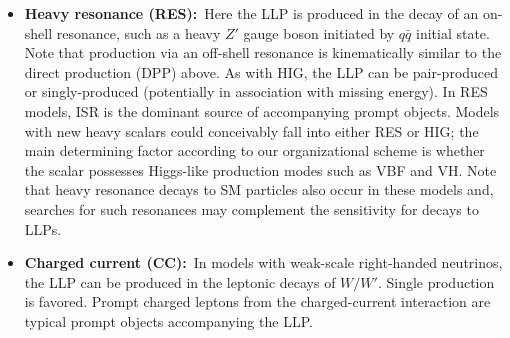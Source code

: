 \begin{itemize}
\item {\bf Heavy resonance (RES):}~Here the LLP is produced in the decay of an on-shell resonance, such as a heavy $Z'$ gauge boson initiated by $q\bar{q}$ initial state. Note that production via an off-shell resonance is kinematically similar to the direct production (DPP) above.  As with HIG, the LLP can be pair-produced or singly-produced (potentially in association with missing energy). In RES models, ISR is the dominant source of accompanying prompt objects. Models with new heavy scalars could conceivably fall into either RES or HIG; the main determining factor according to our organizational scheme is whether the scalar possesses Higgs-like production modes such as VBF and VH. Note that heavy resonance decays to SM particles also occur in these models and, searches for such resonances \cite{Khachatryan:2016zqb,Sirunyan:2016iap,Aaboud:2017yvp,Sirunyan:2017dnz,Aaboud:2017buh,Aaboud:2018juj,Aaboud:2018zba} may complement the sensitivity for decays to LLPs.

\item {\bf Charged current (CC):}~In models with weak-scale right-handed neutrinos, the LLP can be produced in the leptonic decays of $W/W'$. Single production is favored.  Prompt charged leptons from the charged-current interaction are typical prompt objects accompanying the LLP.
\end{itemize}
%
